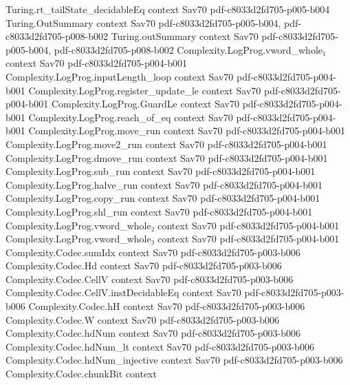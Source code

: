 \begin{theorem}
\proofstep
  {Turing.rt_tailState_decidableEq}
  {context}
  {Sav70}
  {pdf-c8033d2fd705-p005-b004}
\proofstep
  {Turing.OutSummary}
  {context}
  {Sav70}
  {pdf-c8033d2fd705-p005-b004,
    pdf-c8033d2fd705-p008-b002}
\proofstep
  {Turing.outSummary}
  {context}
  {Sav70}
  {pdf-c8033d2fd705-p005-b004,
    pdf-c8033d2fd705-p008-b002}
\proofstep
  {Complexity.LogProg.vword_whole₁}
  {context}
  {Sav70}
  {pdf-c8033d2fd705-p004-b001}
\proofstep
  {Complexity.LogProg.inputLength_loop}
  {context}
  {Sav70}
  {pdf-c8033d2fd705-p004-b001}
\proofstep
  {Complexity.LogProg.register_update_le}
  {context}
  {Sav70}
  {pdf-c8033d2fd705-p004-b001}
\proofstep
  {Complexity.LogProg.GuardLe}
  {context}
  {Sav70}
  {pdf-c8033d2fd705-p004-b001}
\proofstep
  {Complexity.LogProg.reach_of_eq}
  {context}
  {Sav70}
  {pdf-c8033d2fd705-p004-b001}
\proofstep
  {Complexity.LogProg.move_run}
  {context}
  {Sav70}
  {pdf-c8033d2fd705-p004-b001}
\proofstep
  {Complexity.LogProg.move2_run}
  {context}
  {Sav70}
  {pdf-c8033d2fd705-p004-b001}
\proofstep
  {Complexity.LogProg.dmove_run}
  {context}
  {Sav70}
  {pdf-c8033d2fd705-p004-b001}
\proofstep
  {Complexity.LogProg.sub_run}
  {context}
  {Sav70}
  {pdf-c8033d2fd705-p004-b001}
\proofstep
  {Complexity.LogProg.halve_run}
  {context}
  {Sav70}
  {pdf-c8033d2fd705-p004-b001}
\proofstep
  {Complexity.LogProg.copy_run}
  {context}
  {Sav70}
  {pdf-c8033d2fd705-p004-b001}
\proofstep
  {Complexity.LogProg.shl_run}
  {context}
  {Sav70}
  {pdf-c8033d2fd705-p004-b001}
\proofstep
  {Complexity.LogProg.vword_whole₂}
  {context}
  {Sav70}
  {pdf-c8033d2fd705-p004-b001}
\proofstep
  {Complexity.LogProg.vword_whole₃}
  {context}
  {Sav70}
  {pdf-c8033d2fd705-p004-b001}
\proofstep
  {Complexity.Codec.sumIdx}
  {context}
  {Sav70}
  {pdf-c8033d2fd705-p003-b006}
\proofstep
  {Complexity.Codec.Hd}
  {context}
  {Sav70}
  {pdf-c8033d2fd705-p003-b006}
\proofstep
  {Complexity.Codec.CellV}
  {context}
  {Sav70}
  {pdf-c8033d2fd705-p003-b006}
\proofstep
  {Complexity.Codec.CellV.instDecidableEq}
  {context}
  {Sav70}
  {pdf-c8033d2fd705-p003-b006}
\proofstep
  {Complexity.Codec.hH}
  {context}
  {Sav70}
  {pdf-c8033d2fd705-p003-b006}
\proofstep
  {Complexity.Codec.W}
  {context}
  {Sav70}
  {pdf-c8033d2fd705-p003-b006}
\proofstep
  {Complexity.Codec.hdNum}
  {context}
  {Sav70}
  {pdf-c8033d2fd705-p003-b006}
\proofstep
  {Complexity.Codec.hdNum_lt}
  {context}
  {Sav70}
  {pdf-c8033d2fd705-p003-b006}
\proofstep
  {Complexity.Codec.hdNum_injective}
  {context}
  {Sav70}
  {pdf-c8033d2fd705-p003-b006}
\proofstep
  {Complexity.Codec.chunkBit}
  {context}

\end{theorem}
